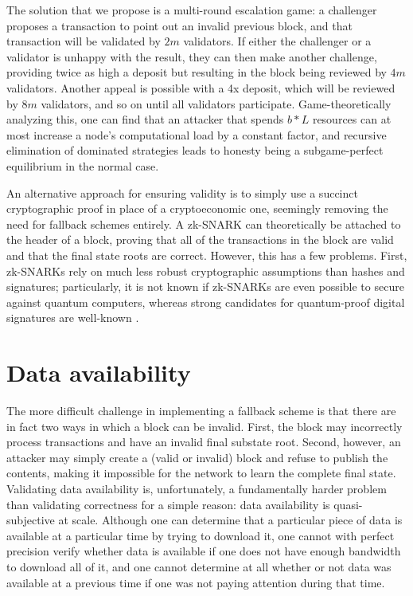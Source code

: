 \documentclass[11pt,a4paper]{report}
\theoremstyle{plain}
\theoremstyle{definition}
\theoremstyle{remark}
\begin{document}
The solution that we propose is a multi-round escalation game: a challenger proposes a transaction to point out an invalid previous block, and that transaction will be validated by $2m$ validators. If either the challenger or a validator is unhappy with the result, they can then make another challenge, providing twice as high a deposit but resulting in the block being reviewed by $4m$ validators. Another appeal is possible with a 4x deposit, which will be reviewed by $8m$ validators, and so on until all validators participate. Game-theoretically analyzing this, one can find that an attacker that spends $b * L$ resources can at most increase a node's computational load by a constant factor, and recursive elimination of dominated strategies leads to honesty being a subgame-perfect equilibrium in the normal case.

An alternative approach for ensuring validity is to simply use a succinct cryptographic proof in place of a cryptoeconomic one, seemingly removing the need for fallback schemes entirely. A zk-SNARK can theoretically be attached to the header of a block, proving that all of the transactions in the block are valid and that the final state roots are correct. However, this has a few problems. First, zk-SNARKs rely on much less robust cryptographic assumptions than hashes and signatures; particularly, it is not known if zk-SNARKs are even possible to secure against quantum computers, whereas strong candidates for quantum-proof digital signatures are well-known \cite{ntrusign} \cite{hashladder} \cite{sphincs}.

\chapter{Data availability}

The more difficult challenge in implementing a fallback scheme is that there are in fact two ways in which a block can be invalid. First, the block may incorrectly process transactions and have an invalid final substate root. Second, however, an attacker may simply create a (valid or invalid) block and refuse to publish the contents, making it impossible for the network to learn the complete final state. Validating data availability is, unfortunately, a fundamentally harder problem than validating correctness for a simple reason: data availability is quasi-subjective at scale. Although one can determine that a particular piece of data is available at a particular time by trying to download it, one cannot with perfect precision verify whether data is available if one does not have enough bandwidth to download all of it, and one cannot determine at all whether or not data was available at a previous time if one was not paying attention during that time.
\end{document}
